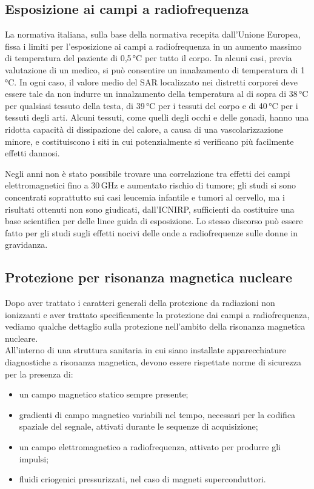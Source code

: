 \documentclass{report}
\numberwithin{equation}{section}
\numberwithin{figure}{section}
\begin{document}
\subsection{Esposizione ai campi a radiofrequenza}
La normativa italiana, sulla base della normativa recepita dall'Unione Europea, fissa i limiti per l’esposizione ai campi a radiofrequenza in un aumento massimo di temperatura del paziente di 0,5\,°C per tutto il corpo. In alcuni casi, previa valutazione di un medico, si può consentire un innalzamento di temperatura di 1\,°C. In ogni caso, il valore medio del SAR localizzato nei distretti corporei deve essere tale da non indurre un innalzamento della temperatura al di sopra di 38\,°C per qualsiasi tessuto della testa, di 39\,°C per i tessuti del corpo e di 40\,°C per i tessuti degli arti. Alcuni tessuti, come quelli degli occhi e delle gonadi, hanno una ridotta capacità di dissipazione del calore, a causa di una vascolarizzazione minore, e costituiscono i siti in cui potenzialmente si verificano più facilmente effetti dannosi.

Negli anni non è stato possibile trovare una correlazione tra effetti dei campi elettromagnetici fino a 30\,GHz e aumentato rischio di tumore; gli studi si sono concentrati soprattutto sui casi leucemia infantile e tumori al cervello, ma i risultati ottenuti non sono giudicati, dall'ICNIRP, sufficienti da costituire una base scientifica per delle linee guida di esposizione. Lo stesso discorso può essere fatto per gli studi sugli effetti nocivi delle onde a radiofrequenze sulle donne in gravidanza.

\subsection{Protezione per risonanza magnetica nucleare}
Dopo aver trattato i caratteri generali della protezione da radiazioni non ionizzanti e aver trattato specificamente la protezione dai campi a radiofrequenza, vediamo qualche dettaglio sulla protezione nell'ambito della risonanza magnetica nucleare.\\
All'interno di una struttura sanitaria in cui siano installate apparecchiature diagnostiche a risonanza magnetica, devono essere rispettate norme di sicurezza per la presenza di:
\begin{itemize}[label=$-$]
    \item un campo magnetico statico sempre presente;
    \item gradienti di campo magnetico variabili nel tempo, necessari per la codifica spaziale del segnale, attivati durante le sequenze di acquisizione;
    \item un campo elettromagnetico a radiofrequenza, attivato per produrre gli impulsi;
    \item fluidi criogenici pressurizzati, nel caso di magneti superconduttori.
\end{itemize}
\end{document}
